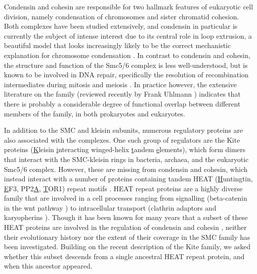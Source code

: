 \documentclass[a4paper,11pt,twoside,openright]{scrbook}
\begin{document}
Condensin and cohesin are responsible for two hallmark features of eukaryotic cell division, namely condensation of chromosomes and sister chromatid cohesion. Both complexes have been studied extensively, and condensin in particular is currently the subject of intense interest due to its central role in loop extrusion, a beautiful model that looks increasingly likely to be the correct mechanistic explanation for chromosome condensation \cite{Nasmyth2001a,Alipour2012,Goloborodko2016,Wang2017}. In contrast to condensin and cohesin, the structure and function of the Smc5/6 complex is less well-understood, but is known to be involved in DNA repair, specifically the resolution of recombination intermediates during mitosis and meiosis \cite{Ampatzidou2006,Farmer2011}. In practice however, the extensive literature on the family (reviewed recently by Frank Uhlmann \cite{Uhlmann2016}) indicates that there is probably a considerable degree of functional overlap between different members of the family, in both prokaryotes and eukaryotes.

In addition to the SMC and kleisin subunits, numerous regulatory proteins are also associated with the complexes. One such group of regulators are the Kite proteins (\underline{K}leisin \underline{i}nteracting winged-helix \underline{t}andem \underline{e}lements), which form dimers that interact with the SMC-kleisin rings in bacteria, archaea, and the eukaryotic Smc5/6 complex. However, these are missing from condensin and cohesin, which instead interact with a number of proteins containing tandem HEAT (\underline{H}untingtin, \underline{E}F3, PP2\underline{A}, \underline{T}OR1) repeat motifs \cite{Andrade1995}. HEAT repeat proteins are a highly diverse family that are involved in a cell processes ranging from signalling (beta-catenin in the wnt pathway \cite{Morin1999}) to intracellular transport (clathrin adaptors \cite{McMahon2004} and karyopherins \cite{Chook2011}). Though it has been known for many years that a subset of these HEAT proteins are involved in the regulation of condensin and cohesin \cite{Neuwald2000}, neither their evolutionary history nor the extent of their coverage in the SMC family has been investigated. Building on the recent description of the Kite family, we asked whether this subset descends from a single ancestral HEAT repeat protein, and when this ancestor appeared.
\end{document}
